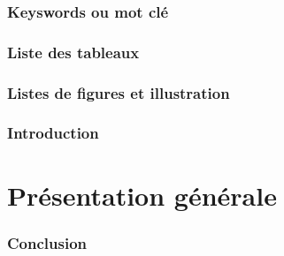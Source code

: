 \documentclass[12pt,a4paper]{report}
\begin{document}
\pagebreak


\begin{abstract}
	\lipsum[2]
\end{abstract}
\begin{abstract}
	\lipsum[2]
\end{abstract}


\section*{Keyswords ou mot clé}

\pagebreak
\section*{Liste des tableaux}

\pagebreak

\section*{Listes de figures et illustration}

\newpage 	
{}		
\pagestyle{fancy}


\newpage
\section*{Introduction}
\newpage

\part{Présentation générale}


%


%



%


%



\newpage
{}
\section*{Conclusion}
\newpage
%
%

			
\end{document}
